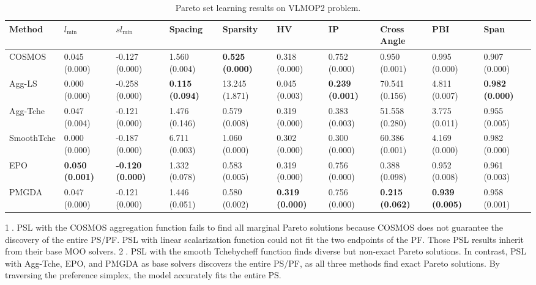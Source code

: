 \begin{table}[]
\setlength\tabcolsep{2.0 pt}
\centering
\scriptsize
\caption{Pareto set learning results on VLMOP2 problem.} \label{tab:psl_synthetic}
\tiny 
    \begin{tabular}{l|l|l|l|l|l|l|l|l|l}
    \toprule
    Method & $l_\mathrm{min}$ & $sl_\mathrm{min}$ & Spacing           & Sparsity          & HV                & IP                & Cross Angle       & PBI               & Span              \\
    \midrule
    COSMOS & 0.045 (0.000)     & -0.127 (0.000)     & 1.560 (0.004)     & \textbf{0.525 (0.000)} & 0.318 (0.000)     & 0.752 (0.000)     & 0.950 (0.001)     & 0.995 (0.000)     & 0.907 (0.000)     \\
    Agg-LS & 0.000 (0.000)     & -0.258 (0.000)     & \textbf{0.115 (0.094)} & 13.245 (1.871)    & 0.045 (0.003)     & \textbf{0.239 (0.001)} & 70.541 (0.156)    & 4.811 (0.007)     & \textbf{0.982 (0.000)} \\
    Agg-Tche & 0.047 (0.004)     & -0.121 (0.000)     & 1.476 (0.146)     & 0.579 (0.008)     & 0.319 (0.000)     & 0.383 (0.003)     & 51.558 (0.280)    & 3.775 (0.011)     & 0.955 (0.005)     \\
    SmoothTche & 0.000 (0.000)     & -0.187 (0.000)     & 6.711 (0.003)     & 1.060 (0.000)     & 0.302 (0.000)     & 0.300 (0.000)     & 60.386 (0.001)    & 4.169 (0.000)     & 0.982 (0.000)     \\
    EPO & \textbf{0.050 (0.001)} & \textbf{-0.120 (0.000)} & 1.332 (0.078)     & 0.583 (0.005)     & 0.319 (0.000)     & 0.756 (0.000)     & 0.388 (0.098)     & 0.952 (0.008)     & 0.961 (0.003)     \\
    PMGDA & 0.047 (0.000)     & -0.121 (0.000)     & 1.446 (0.051)     & 0.580 (0.002)     & \textbf{0.319 (0.000)} & 0.756 (0.000)     & \textbf{0.215 (0.062)} & \textbf{0.939 (0.005)} & 0.958 (0.001) \\
    \bottomrule
    \end{tabular}
\end{table}

\textcircled{1}. PSL with the COSMOS aggregation function fails to find all marginal Pareto solutions because COSMOS does not guarantee the discovery of the entire PS/PF. PSL with linear scalarization function could not fit the two endpoints of the PF. Those PSL results inherit from their base MOO solvers.
\textcircled{2}. PSL with the smooth Tchebycheff function finds diverse but non-exact Pareto solutions. In contrast, PSL with Agg-Tche, EPO, and PMGDA as base solvers discovers the entire PS/PF, as all three methods find exact Pareto solutions. By traversing the preference simplex, the model accurately fits the entire PS.

